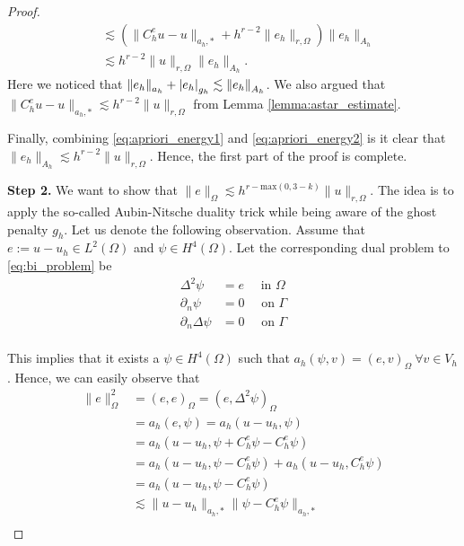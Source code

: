 \begin{proof}
\begin{equation}
\begin{split}
         &\lesssim (\| C _{h}^{e} u - u \|_{a_{h},*  }^{  } + h^{r-2} \| e_{h} \|_{r, \Omega   }^{  }) \|e_{h}\|_{A_{h}} \\
         &\lesssim  h^{r-2} \| u \|_{r, \Omega   }^{  } \|e_{h}\|_{A_{h}}.
    \end{split}
\end{equation}
Here we noticed that $\| e_{h} \|_{a_{h}  }^{  } + \left\lvert e_{h}   \right\rvert_{g_{h}} \lesssim \| e_{h} \|_{ A_{h} }^{  }  $. We also argued that $\| C _{h}^{e} u - u \|_{a_{h},*  }^{  } \lesssim h^{r-2}\| u \|_{ r,\Omega  }^{  }  $ from Lemma
\ref{lemma:astar_estimate}.

Finally, combining \eqref{eq:apriori_energy1} and \eqref{eq:apriori_energy2} is it clear that $\| e_{h} \|_{ A_{h}  }^{  } \lesssim h^{r-2} \| u \|_{r, \Omega   }^{  }  $.
Hence, the first part of the proof is complete.

        \textbf{Step 2.}
        We want to show that $ \| e \|_{ \Omega  }^{  } \lesssim   h^{r- \mathrm{max}(0,3-k)} \| u \|_{ r ,\Omega  }^{  }$. The idea is to apply the so-called Aubin-Nitsche duality trick while being aware of the ghost penalty $g_{h}$. Let us denote the following
        observation.
        Assume that $e:= u -u_{h} \in L^{2}( \Omega ) $ and $\psi  \in H^{4}( \Omega ) $.
        Let the corresponding dual problem to \eqref{eq:bi_problem} be
        \begin{equation}
            \begin{split}
            \Delta ^2 \psi &= e  \quad  \text{ in } \Omega  \\
            \partial _{n} \psi &= 0 \quad \text{ on } \Gamma \\
            \partial _{n} \Delta \psi & = 0 \quad  \text{ on } \Gamma   \\
            \end{split}
        \end{equation}

        This implies that it exists a $\psi \in H^{4}( \Omega ) $ such that $a_{h}( \psi, v ) = ( e,v)_{\Omega } \ \forall v \in V_{h}  $. Hence, we can easily observe that \begin{equation}
            \label{eq:ni_1}
            \begin{split}
        \| e \|_{ \Omega  }^{ 2 }  & = ( e,e)_\Omega   = ( e, \Delta ^2 \psi )_{\Omega } \\
        &= a_{h}( e, \psi ) = a_{h}( u-u_h, \psi ) \\
        &= a_{h}( u-u_h, \psi + C^{e}_{h}\psi  - C^{e}_{h}\psi )  \\
        &= a_{h}( u-u_h, \psi   - C^{e}_{h}\psi ) +  a_{h}( u-u_h, C^{e}_{h}\psi )  \\
        &= a_{h}( u-u_h, \psi  - C^{e}_{h}\psi )  \\
        & \lesssim    \|u-u_{h}  \|_{a_{h},*  }^{  }  \| \psi  - C^{e}_{h}\psi \|_{a_{h},*  }^{  }    \\
            \end{split}
        \end{equation}


\end{proof}
